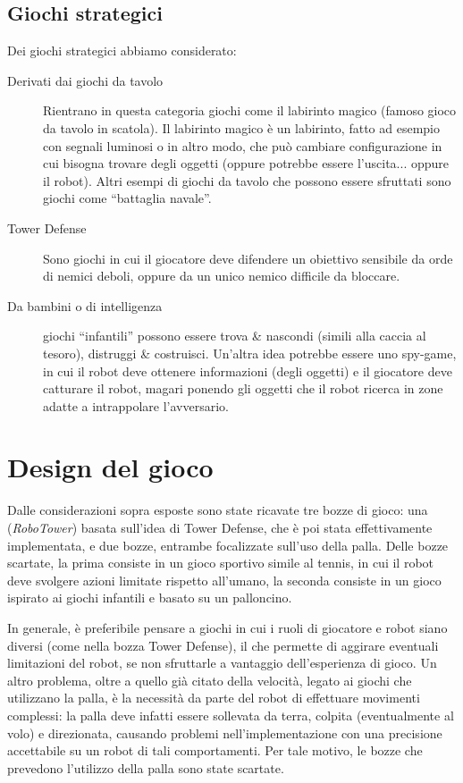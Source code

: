 \subsection*{Giochi strategici} Dei giochi strategici abbiamo considerato:
\begin{description}
\item[Derivati dai giochi da tavolo] Rientrano in questa categoria giochi come il labirinto magico (famoso gioco da tavolo in scatola). Il labirinto magico è un labirinto, fatto ad esempio con segnali luminosi o in altro modo, che può cambiare configurazione in cui bisogna trovare degli oggetti (oppure potrebbe essere l'uscita... oppure il robot). Altri esempi di giochi da tavolo che possono essere sfruttati sono giochi come “battaglia navale”.
\item[Tower Defense] Sono giochi in cui il giocatore deve difendere un obiettivo sensibile da orde di nemici deboli, oppure da un unico nemico difficile da bloccare. 
\item[Da bambini o di intelligenza] giochi “infantili” possono essere trova \& nascondi (simili alla caccia al tesoro), distruggi \& costruisci. Un'altra idea potrebbe essere uno spy-game, in cui il robot deve ottenere informazioni (degli oggetti) e il giocatore deve catturare il robot, magari ponendo gli oggetti che il robot ricerca in zone adatte a intrappolare l'avversario.
\end{description}

\section{Design del gioco}
Dalle considerazioni sopra esposte sono state ricavate tre bozze di gioco: una (\emph{RoboTower}) basata sull'idea di Tower Defense, che è poi stata effettivamente implementata, e due bozze, entrambe focalizzate sull'uso della palla. Delle bozze scartate, la prima consiste in un gioco sportivo simile al tennis, in cui il robot deve svolgere azioni limitate rispetto all'umano, la seconda consiste in un gioco ispirato ai giochi infantili e basato su un palloncino.

In generale, è preferibile pensare a giochi in cui i ruoli di giocatore e robot siano diversi (come nella bozza Tower Defense), il che permette di aggirare eventuali limitazioni del robot, se non sfruttarle a vantaggio dell’esperienza di gioco. Un altro problema, oltre a quello già citato della velocità, legato ai giochi che utilizzano la palla, è la necessità da parte del robot di effettuare movimenti complessi: la palla deve infatti essere sollevata da terra, colpita (eventualmente al volo) e direzionata, causando problemi nell'implementazione con una precisione accettabile su un robot di tali comportamenti. Per tale motivo, le bozze che prevedono l'utilizzo della palla sono state scartate.

